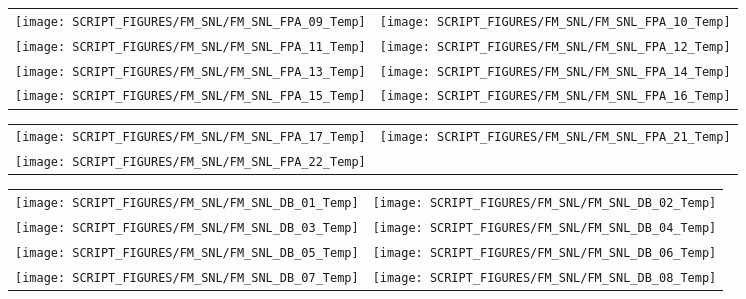 \begin{figure}[!ht]
\begin{tabular*}{\textwidth}{l@{\extracolsep{\fill}}r}
\texttt{[image: SCRIPT\_FIGURES/FM\_SNL/FM\_SNL\_FPA\_09\_Temp]} &
\texttt{[image: SCRIPT\_FIGURES/FM\_SNL/FM\_SNL\_FPA\_10\_Temp]} \\
\texttt{[image: SCRIPT\_FIGURES/FM\_SNL/FM\_SNL\_FPA\_11\_Temp]} &
\texttt{[image: SCRIPT\_FIGURES/FM\_SNL/FM\_SNL\_FPA\_12\_Temp]} \\
\texttt{[image: SCRIPT\_FIGURES/FM\_SNL/FM\_SNL\_FPA\_13\_Temp]} &
\texttt{[image: SCRIPT\_FIGURES/FM\_SNL/FM\_SNL\_FPA\_14\_Temp]} \\
\texttt{[image: SCRIPT\_FIGURES/FM\_SNL/FM\_SNL\_FPA\_15\_Temp]} &
\texttt{[image: SCRIPT\_FIGURES/FM\_SNL/FM\_SNL\_FPA\_16\_Temp]}
\end{tabular*}
\end{figure}

\begin{figure}[!ht]
\begin{tabular*}{\textwidth}{l@{\extracolsep{\fill}}r}
\texttt{[image: SCRIPT\_FIGURES/FM\_SNL/FM\_SNL\_FPA\_17\_Temp]} &
\texttt{[image: SCRIPT\_FIGURES/FM\_SNL/FM\_SNL\_FPA\_21\_Temp]} \\
\texttt{[image: SCRIPT\_FIGURES/FM\_SNL/FM\_SNL\_FPA\_22\_Temp]}
\end{tabular*}
\end{figure}

\begin{figure}[!ht]
\begin{tabular*}{\textwidth}{l@{\extracolsep{\fill}}r}
\texttt{[image: SCRIPT\_FIGURES/FM\_SNL/FM\_SNL\_DB\_01\_Temp]} &
\texttt{[image: SCRIPT\_FIGURES/FM\_SNL/FM\_SNL\_DB\_02\_Temp]} \\
\texttt{[image: SCRIPT\_FIGURES/FM\_SNL/FM\_SNL\_DB\_03\_Temp]} &
\texttt{[image: SCRIPT\_FIGURES/FM\_SNL/FM\_SNL\_DB\_04\_Temp]} \\
\texttt{[image: SCRIPT\_FIGURES/FM\_SNL/FM\_SNL\_DB\_05\_Temp]} &
\texttt{[image: SCRIPT\_FIGURES/FM\_SNL/FM\_SNL\_DB\_06\_Temp]} \\
\texttt{[image: SCRIPT\_FIGURES/FM\_SNL/FM\_SNL\_DB\_07\_Temp]} &
\texttt{[image: SCRIPT\_FIGURES/FM\_SNL/FM\_SNL\_DB\_08\_Temp]}
\end{tabular*}
\end{figure}

